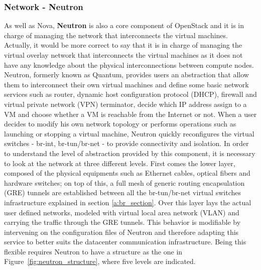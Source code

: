 \subsubsection{Network - Neutron}
\label{sec:neutron}
As well as Nova, \textbf{Neutron} is also a core component of OpenStack and it is in charge of managing the network that interconnects the virtual machines.
Actually, it would be more correct to say that it is in charge of managing the virtual overlay network that interconnects the virtual machines as it does not have any knowledge about the physical interconnections between compute nodes.
Neutron, formerly known as Quantum, provides users an abstraction that allow them to interconnect their own virtual machines and define some basic network services such as router, dynamic host configuration protocol (DHCP), firewall and virtual private network (VPN) terminator, decide which IP address assign to a VM and choose whether a VM is reachable from the Internet or not.
When a user decides to modify his own network topology or performs operations such as launching or stopping a virtual machine, Neutron quickly reconfigures the virtual switches - br-int, br-tun/br-net - to provide connectivity and isolation.
In order to understand the level of abstraction provided by this component, it is necessary to look at the network at three different levels.
First comes the lower layer, composed of the physical equipments such as Ethernet cables, optical fibers and hardware switches; on top of this, a full mesh of generic routing encapsulation (GRE) tunnels are established between all the br-tun/br-net virtual switches infrastructure explained in section \ref{a:br_section}.
Over this layer lays the actual user defined networks, modeled with virtual local area network (VLAN) and carrying the traffic through the GRE tunnels.
This behavior is modifiable by intervening on the configuration files of Neutron and therefore adapting this service to better suits the datacenter communication infrastructure.
Being this flexible requires Neutron to have a structure as the one in Figure~\ref{fig:neutron_structure}, where five levels are indicated.

